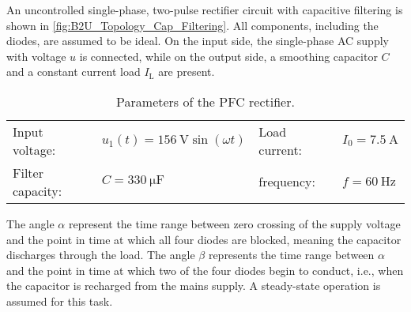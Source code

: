 
An uncontrolled single-phase, two-pulse rectifier circuit with capacitive filtering 
is shown in \autoref{fig:B2U_Topology_Cap_Filtering}.
All components, including the diodes, are assumed to be ideal. On the input side, 
the single-phase AC supply with voltage $u$ is connected, while on the output side, 
a smoothing capacitor $C$ and a constant current load $I_\mathrm{L}$ are present.



\begin{table}[ht]
    \centering  %
    \begin{tabular}{llll}
        \toprule
        
        Input voltage: &  $u_{\mathrm{1}}(t) = \SI{156}{\volt} \sin(\omega t)$ & Load current: & $I_{\mathrm{0}} = \SI{7.5}{\ampere}$ \\ 
        Filter capacity: & $C = \SI{330}{\micro\farad}$  & frequency: & $f= \SI{60}{\hertz}$ \\ 
        \bottomrule
    \end{tabular}
    \caption{Parameters of the PFC rectifier.}  
    \label{table:ex05_Parameters of the circuit}
\end{table}

The angle $\alpha$ represent the time range between zero crossing of the supply voltage and the point in time
at which all four diodes are blocked, meaning the capacitor discharges through the load. The angle $\beta$ 
represents the time range between $\alpha$ and the point in time at which two of the four diodes begin to 
conduct, i.e., when the capacitor is recharged from the mains supply.
A steady-state operation is assumed for this task.

